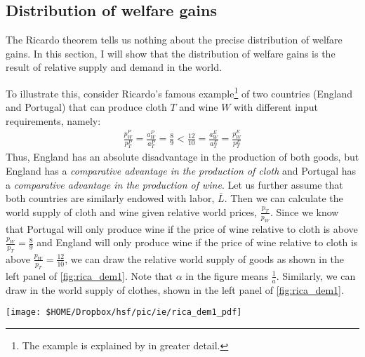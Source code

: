 %
	
	\pbn
	\subsection{Distribution of welfare gains}
	The Ricardo theorem tells us nothing about the precise distribution of welfare gains. In this section, I will show that the distribution of welfare gains is the result of relative supply and demand in the world.
	
	To illustrate this, consider Ricardo's famous example\footnote{The example is explained by \citet{Academy2012International} in greater detail.} of two countries (England and Portugal) that can produce cloth $T$ and wine $W$ with different input requirements, namely:
	\begin{align*}
		\frac{p^P_W}{p^P_T}=\frac{a^P_W}{a^P_T}=\frac{8}{9}<\frac{12}{10}=\frac{a^E_W}{a^E_T}= \frac{p^E_W}{p^E_T}
	\end{align*}
	Thus, England has an absolute disadvantage in the production of both goods, but England has a \textit{comparative advantage in the production of cloth} and Portugal has a \textit{comparative advantage in the production of wine}. Let us further assume that both countries are similarly endowed with labor, $\bar{L}$. Then we can calculate the world supply of cloth and wine given relative world prices, $\frac{p_T}{p_W}$. Since we know that Portugal will only produce wine if the price of wine relative to cloth is above $\frac{p_W}{p_T}=\frac{8}{9}$ and England will only produce wine if the price of wine relative to cloth is above $\frac{p_W}{p_T}=\frac{12}{10}$, we can draw the relative world supply of goods as shown in the left panel of \autoref{fig:rica_dem1}. Note that $\alpha$ in the figure means $\frac{1}{a}$. Similarly, we can draw in the world supply of clothes, shown in the left panel of \autoref{fig:rica_dem1}.
	
	
	\begin{center}
		\texttt{[image: \$HOME/Dropbox/hsf/pic/ie/rica\_dem1\_pdf]}
		\label{fig:rica_dem1}\bigskip
	\end{center}
	
